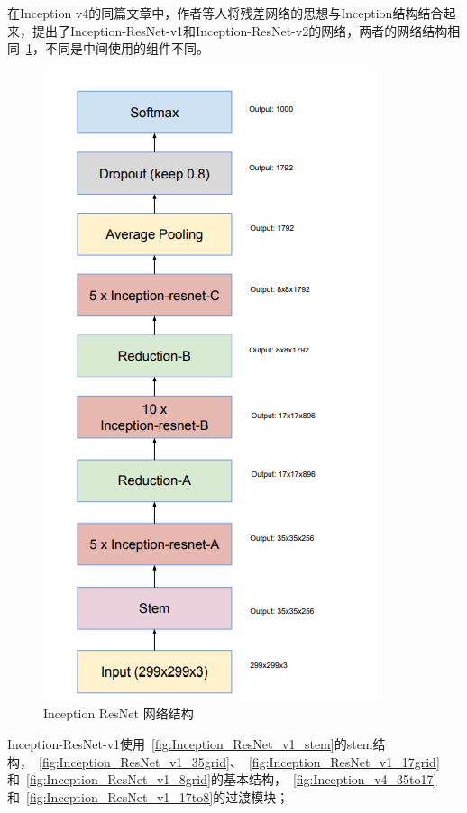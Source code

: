 在Inception v4的同篇文章中，作者等人将残差网络的思想与Inception结构结合起来，提出了Inception-ResNet-v1和Inception-ResNet-v2的网络，两者的网络结构相同~\ref{fig:Inception_ResNet_model}，不同是中间使用的组件不同。

\begin{figure}[htbp]
	\centering
	\includegraphics[width=0.6\linewidth]{readings_figures/Inception_ResNet_model.png}
	\caption{Inception ResNet 网络结构}
	\label{fig:Inception_ResNet_model}
\end{figure}

Inception-ResNet-v1使用~\ref{fig:Inception_ResNet_v1_stem}的stem结构，~\ref{fig:Inception_ResNet_v1_35grid}、~\ref{fig:Inception_ResNet_v1_17grid}和~\ref{fig:Inception_ResNet_v1_8grid}的基本结构，~\ref{fig:Inception_v4_35to17}和~\ref{fig:Inception_ResNet_v1_17to8}的过渡模块；

